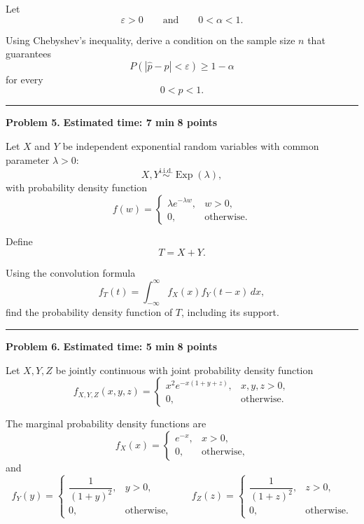 \documentclass[11pt]{article}
\begin{document}
Let
\[
\varepsilon>0
\qquad\text{and}\qquad
0<\alpha<1.
\]

Using Chebyshev's inequality, derive a condition on the sample size \(n\) that
guarantees
\[
P\left(|\widehat p-p|<\varepsilon\right)
\geq
1-\alpha
\]
for every
\[
0<p<1.
\]

\hrule



\newpage

\begin{problemheader}
\textbf{Problem 5.}
\hfill
\textbf{Estimated time: 7 min}
\qquad
\textbf{8 points}
\end{problemheader}

Let \(X\) and \(Y\) be independent exponential random variables with common
parameter \(\lambda>0\):
\[
X,Y\overset{\mathrm{i.i.d.}}{\sim}\operatorname{Exp}(\lambda),
\]
with probability density function
\[
f(w)=
\begin{cases}
\lambda e^{-\lambda w}, & w>0,\\
0, & \text{otherwise}.
\end{cases}
\]

Define
\[
T=X+Y.
\]

Using the convolution formula
\[
f_T(t)
=
\int_{-\infty}^{\infty}
f_X(x)f_Y(t-x)\,dx,
\]
find the probability density function of \(T\), including its support.

\hrule



\newpage

\begin{problemheader}
\textbf{Problem 6.}
\hfill
\textbf{Estimated time: 5 min}
\qquad
\textbf{8 points}
\end{problemheader}

Let \(X,Y,Z\) be jointly continuous with joint probability density function
\[
f_{X,Y,Z}(x,y,z)
=
\begin{cases}
x^2e^{-x(1+y+z)}, & x,y,z>0,\\
0, & \text{otherwise}.
\end{cases}
\]

The marginal probability density functions are
\[
f_X(x)
=
\begin{cases}
e^{-x}, & x>0,\\
0, & \text{otherwise},
\end{cases}
\]
and
\[
f_Y(y)
=
\begin{cases}
\dfrac{1}{(1+y)^2}, & y>0,\\
0, & \text{otherwise},
\end{cases}
\qquad
f_Z(z)
=
\begin{cases}
\dfrac{1}{(1+z)^2}, & z>0,\\
0, & \text{otherwise}.
\end{cases}
\]
\end{document}
